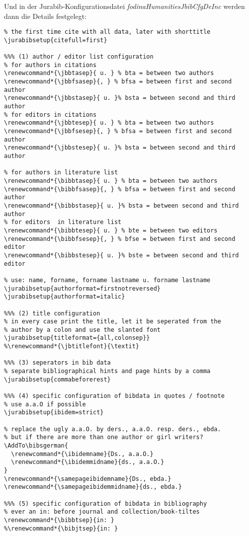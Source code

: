 \normalsize
Und in der Jurabib-Konfigurationsdatei \emph{fodinaHumanitiesJbibCfgDeInc}
werden dann die Details festgelegt:
\small
\begin{verbatim}
% the first time cite with all data, later with shorttitle
\jurabibsetup{citefull=first}

%%% (1) author / editor list configuration
% for authors in citations
\renewcommand*{\jbbtasep}{ u. } % bta = between two authors
\renewcommand*{\jbbfsasep}{, } % bfsa = between first and second author
\renewcommand*{\jbbstasep}{ u. }% bsta = between second and third author
% for editors in citations
\renewcommand*{\jbbtesep}{ u. } % bta = between two authors
\renewcommand*{\jbbfsesep}{, } % bfsa = between first and second author
\renewcommand*{\jbbstesep}{ u. }% bsta = between second and third author

% for authors in literature list
\renewcommand*{\bibbtasep}{ u. } % bta = between two authors
\renewcommand*{\bibbfsasep}{, } % bfsa = between first and second author
\renewcommand*{\bibbstasep}{ u. }% bsta = between second and third author
% for editors  in literature list
\renewcommand*{\bibbtesep}{ u. } % bte = between two editors
\renewcommand*{\bibbfsesep}{, } % bfse = between first and second editor
\renewcommand*{\bibbstesep}{ u. }% bste = between second and third editor

% use: name, forname, forname lastname u. forname lastname
\jurabibsetup{authorformat=firstnotreversed}
\jurabibsetup{authorformat=italic}

%%% (2) title configuration
% in every case print the title, let it be seperated from the 
% author by a colon and use the slanted font
\jurabibsetup{titleformat={all,colonsep}}
%\renewcommand*{\jbtitlefont}{\textit}

%%% (3) seperators in bib data
% separate bibliographical hints and page hints by a comma
\jurabibsetup{commabeforerest}

%%% (4) specific configuration of bibdata in quotes / footnote
% use a.a.O if possible
\jurabibsetup{ibidem=strict}

% replace the ugly a.a.O. by ders., a.a.O. resp. ders., ebda.
% but if there are more than one author or girl writers?
\AddTo\bibsgerman{
  \renewcommand*{\ibidemname}{Ds., a.a.O.}
  \renewcommand*{\ibidemmidname}{ds., a.a.O.}
}
\renewcommand*{\samepageibidemname}{Ds., ebda.}
\renewcommand*{\samepageibidemmidname}{ds., ebda.}

%%% (5) specific configuration of bibdata in bibliography
% ever an in: before journal and collection/book-tiltes 
\renewcommand*{\bibbtsep}{in: }
%\renewcommand*{\bibjtsep}{in: }


\end{verbatim}
